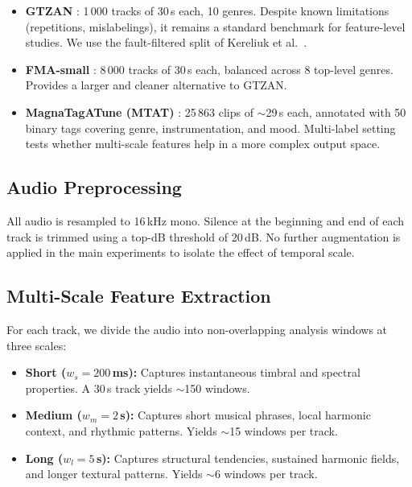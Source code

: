 \documentclass[conference]{IEEEtran}
\begin{document}
\begin{itemize}
    \item \textbf{GTZAN} \cite{tzanetakis2002musical}: 1\,000 tracks of 30\,s each, 10 genres. Despite known limitations (repetitions, mislabelings), it remains a standard benchmark for feature-level studies. We use the fault-filtered split of Kereliuk et al.\ \cite{kereliuk2015counterexample}.
    \item \textbf{FMA-small} \cite{defferrard2017fma}: 8\,000 tracks of 30\,s each, balanced across 8 top-level genres. Provides a larger and cleaner alternative to GTZAN.
    \item \textbf{MagnaTagATune (MTAT)} \cite{law2009evaluation}: 25\,863 clips of $\sim$29\,s each, annotated with 50 binary tags covering genre, instrumentation, and mood. Multi-label setting tests whether multi-scale features help in a more complex output space.
\end{itemize}

\subsection{Audio Preprocessing}

All audio is resampled to 16\,kHz mono.
Silence at the beginning and end of each track is trimmed using a top-dB threshold of 20\,dB.
No further augmentation is applied in the main experiments to isolate the effect of temporal scale.

\subsection{Multi-Scale Feature Extraction}

For each track, we divide the audio into non-overlapping analysis windows at three scales:

\begin{itemize}
    \item \textbf{Short ($w_s = 200$\,ms):} Captures instantaneous timbral and spectral properties. A 30\,s track yields $\sim$150 windows.
    \item \textbf{Medium ($w_m = 2$\,s):} Captures short musical phrases, local harmonic context, and rhythmic patterns. Yields $\sim$15 windows per track.
    \item \textbf{Long ($w_l = 5$\,s):} Captures structural tendencies, sustained harmonic fields, and longer textural patterns. Yields $\sim$6 windows per track.
\end{itemize}
\end{document}
